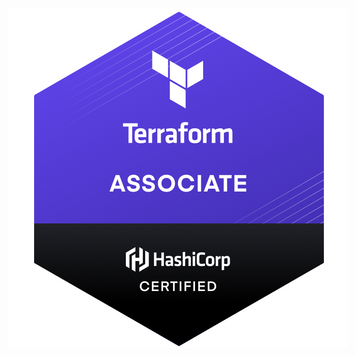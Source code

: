 \documentclass{article}
\begin{document}
\begin{table}[hbt!]
\includegraphics[scale=0.39]{Terraform-Associate-Badge.png}

\end{table}
 
\end{document}
